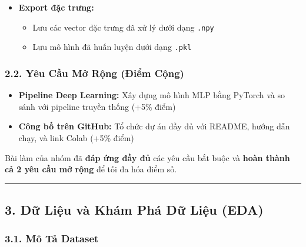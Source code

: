 \documentclass[
]{article}
\providecommand{\tightlist}{%
  \setlength{\itemsep}{0pt}\setlength{\parskip}{0pt}}
\begin{document}
\begin{itemize}
  \begin{itemize}
  \tightlist
  \item
    Bar Chart so sánh các chỉ số giữa các mô hình
  \item
    ROC Curve
  \item
    Confusion Matrix
  \end{itemize}
\item
  \textbf{Export đặc trưng:}

  \begin{itemize}
  \tightlist
  \item
    Lưu các vector đặc trưng đã xử lý dưới dạng \texttt{.npy}
  \item
    Lưu mô hình đã huấn luyện dưới dạng \texttt{.pkl}
  \end{itemize}
\end{itemize}

\subsubsection{2.2. Yêu Cầu Mở Rộng (Điểm
Cộng)}\label{22-yuxeau-cux1ea7u-mux1edf-rux1ed9ng-ux111iux1ec3m-cux1ed9ng}

\begin{itemize}
\tightlist
\item
  \textbf{Pipeline Deep Learning:} Xây dựng mô hình MLP bằng PyTorch và
  so sánh với pipeline truyền thống (+5\% điểm)
\item
  \textbf{Công bố trên GitHub:} Tổ chức dự án đầy đủ với README, hướng
  dẫn chạy, và link Colab (+5\% điểm)
\end{itemize}

Bài làm của nhóm đã \textbf{đáp ứng đầy đủ} các yêu cầu bắt buộc và
\textbf{hoàn thành cả 2 yêu cầu mở rộng} để tối đa hóa điểm số.

\begin{center}\rule{0.5\linewidth}{0.5pt}\end{center}

\subsection{3. Dữ Liệu và Khám Phá Dữ Liệu
(EDA)}\label{3-dux1eef-liux1ec7u-vuxe0-khuxe1m-phuxe1-dux1eef-liux1ec7u-eda}

\subsubsection{3.1. Mô Tả Dataset}\label{31-muxf4-tux1ea3-dataset}
\end{document}
